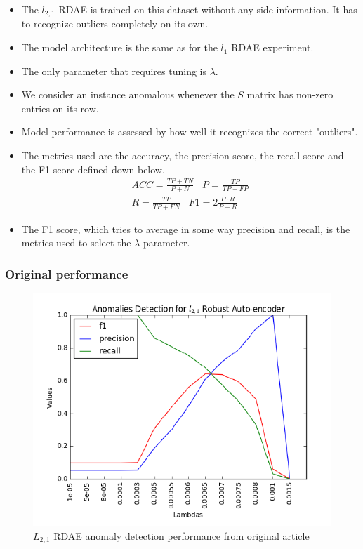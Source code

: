 \documentclass{beamer}
\theoremstyle{plain}
\theoremstyle{definition}
\theoremstyle{remark}
\begin{document}
\begin{frame}
	\begin{itemize}
		\item The $l_{2,1}$ RDAE is trained on this dataset without any side information. It has to recognize outliers completely on its own.
		\item The model architecture is the same as for the $l_1$ RDAE experiment.
		\item The only parameter that requires tuning is $\lambda$.
		\item We consider an instance anomalous whenever the $S$ matrix has non-zero entries on its row.
	\end{itemize}
\end{frame}

\begin{frame}
	\begin{itemize}
		\item Model performance is assessed by how well it recognizes the correct "outliers".
		\item The metrics used are the accuracy, the precision score, the recall score and the F1 score defined down below.
			\begin{align}
				ACC = \frac{TP+TN}{P+N}\;\;\; P = \frac{TP}{TP+FP}\\
				R = \frac{TP}{TP+FN} \;\;\; F1 = 2\frac{P\cdot R}{P+R}
			\end{align}
		\item The F1 score, which tries to average in some way precision and recall, is the metrics used to select the $\lambda$ parameter.
	\end{itemize}
\end{frame}

\begin{frame}
	\frametitle{Original performance}
	\begin{figure}
		\centering
		\includegraphics[width=0.7\linewidth]{Images/l21_perf_article.png}
		\caption[]{$L_{2,1}$ RDAE anomaly detection performance from original article}
	\end{figure}
\end{frame}
\end{document}

